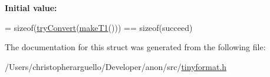 {\bfseries Initial value\+:}
\begin{DoxyCode}
=
            \textcolor{keyword}{sizeof}(\mbox{\hyperlink{structtinyformat_1_1detail_1_1is__convertible_a304a3fb17a674e61c688dd1219875870}{tryConvert}}(\mbox{\hyperlink{structtinyformat_1_1detail_1_1is__convertible_af2068cf5629a702c9ccb3b8136c6fe2e}{makeT1}}())) == \textcolor{keyword}{sizeof}(succeed)
\end{DoxyCode}


The documentation for this struct was generated from the following file\+:\begin{DoxyCompactItemize}
\item 
/\+Users/christopherarguello/\+Developer/anon/src/\mbox{\hyperlink{tinyformat_8h}{tinyformat.\+h}}\end{DoxyCompactItemize}
